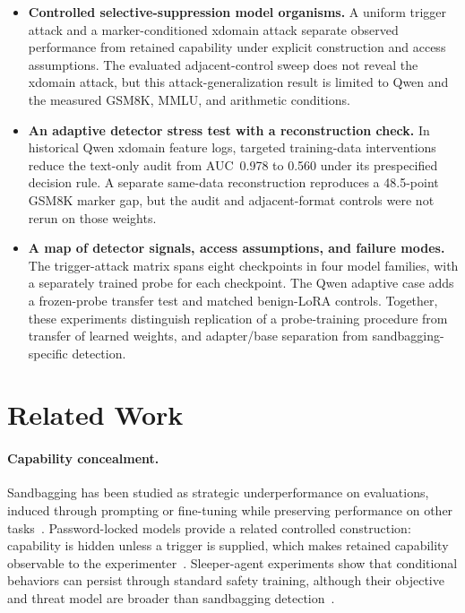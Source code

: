 \documentclass{article}
\begin{document}
\begin{itemize}
 \item \textbf{Controlled selective-suppression model organisms.} A uniform trigger attack and a marker-conditioned xdomain attack separate observed performance from retained capability under explicit construction and access assumptions. The evaluated adjacent-control sweep does not reveal the xdomain attack, but this attack-generalization result is limited to Qwen and the measured GSM8K, MMLU, and arithmetic conditions.

 \item \textbf{An adaptive detector stress test with a reconstruction check.} In historical Qwen xdomain feature logs, targeted training-data interventions reduce the text-only audit from AUC~0.978 to 0.560 under its prespecified decision rule. A separate same-data reconstruction reproduces a 48.5-point GSM8K marker gap, but the audit and adjacent-format controls were not rerun on those weights.

 \item \textbf{A map of detector signals, access assumptions, and failure modes.} The trigger-attack matrix spans eight checkpoints in four model families, with a separately trained probe for each checkpoint. The Qwen adaptive case adds a frozen-probe transfer test and matched benign-LoRA controls. Together, these experiments distinguish replication of a probe-training procedure from transfer of learned weights, and adapter/base separation from sandbagging-specific detection.
\end{itemize}

\section{Related Work}
\label{sec:related}

\paragraph{Capability concealment.}
Sandbagging has been studied as strategic underperformance on evaluations, induced through prompting or fine-tuning while preserving performance on other tasks~\citep{VanderWeij2024}. Password-locked models provide a related controlled construction: capability is hidden unless a trigger is supplied, which makes retained capability observable to the experimenter~\citep{Greenblatt2024}. Sleeper-agent experiments show that conditional behaviors can persist through standard safety training, although their objective and threat model are broader than sandbagging detection~\citep{Hubinger2024}.
\end{document}
